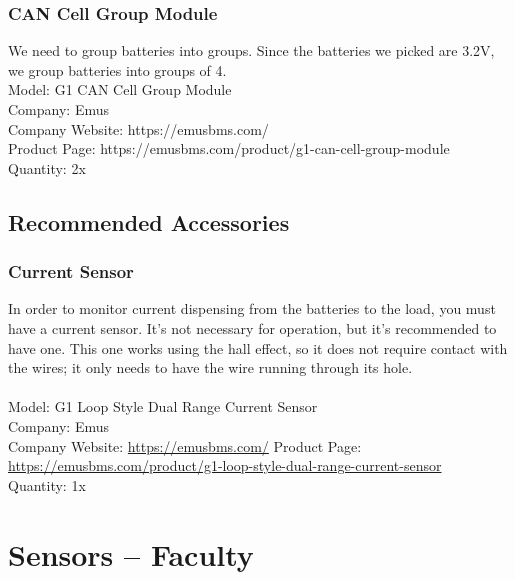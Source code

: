 \subsubsection{CAN Cell Group Module}

We need to group batteries into groups.
Since the batteries we picked are 3.2V, we group batteries into groups of 4.  
 \\
Model: G1 CAN Cell Group Module\\
Company: Emus \\
Company Website: https://emusbms.com/ \\
Product Page: https://emusbms.com/product/g1-can-cell-group-module \\
Quantity: 2x\\


\subsection{Recommended Accessories}

\subsubsection{Current Sensor}

In order to monitor current dispensing from the batteries to the load, you must have a current sensor. It’s not necessary for operation, but it’s recommended to have one. This one works using the hall effect, so it does not require contact with the wires; it only needs to have the wire running through its hole. \\
 \\
Model: G1 Loop Style Dual Range Current Sensor\\
Company: Emus \\
Company Website: \href{https://emusbms.com/}{https://emusbms.com/}
Product Page: \href{https://emusbms.com/product/g1-loop-style-dual-range-current-sensor}{https://emusbms.com/product/g1-loop-style-dual-range-current-sensor}\\
Quantity: 1x \\



 
\section{Sensors – Faculty}
